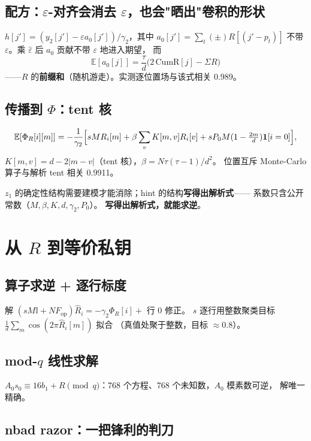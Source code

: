 \documentclass[11pt,a4paper]{ctexart}
\begin{document}
\subsection{配方：$\varepsilon$-对齐会消去 $\varepsilon$，也会"晒出"卷积的形状}

$h[j'] = (y_2[j'] - \varepsilon a_0[j'])/\gamma_2$，其中 $a_0[j'] = \sum_t(\pm)R[(j'-p_t)]$
不带 $\varepsilon$。乘 $\hat\varepsilon$ 后 $a_0$ 贡献不带 $\varepsilon$ 地进入期望，
而
\[
\mathbb{E}[a_0[j]] = \frac{\tau}{d}\bigl(2\,\mathrm{CumR}[j] - \Sigma R\bigr)
\]
——$R$ 的\textbf{前缀和}（随机游走）。实测逐位置场与该式相关 0.989。

\subsection{传播到 $\Phi$：tent 核}

\[
\mathbb{E}[\Phi_R[i][m]] = -\frac{1}{\gamma_2}\Bigl[
s M R_i[m] + \beta\sum_v K[m,v]R_i[v]
+ s P_0 M (1-\tfrac{2m}{d})\mathbf{1}[i=0]\Bigr],
\]
$K[m,v] = d - 2|m-v|$（tent 核），$\beta = N\tau(\tau-1)/d^2$。
位置互斥 Monte-Carlo 算子与解析 tent 相关 0.9911。

\begin{intuition}[本章的"啊哈"]
$z_1$ 的确定性结构需要建模才能消除；hint 的结构\textbf{写得出解析式}——
系数只含公开常数（$M,\beta,K,d,\gamma_2,P_0$）。
\textbf{写得出解析式，就能求逆}。
\end{intuition}

\section{从 $R$ 到等价私钥}

\subsection{算子求逆 + 逐行标度}

解 $(sM\mathbb{I} + N F_{\mathrm{op}})\hat R_i = -\gamma_2\Phi_R[i] + $ 行 0 修正。
$s$ 逐行用整数聚类目标 $\frac1d\sum_m\cos(2\pi\hat R_i[m])$ 拟合
（真值处聚于整数，目标 $\approx0.8$）。

\subsection{mod-$q$ 线性求解}

$A_0 s_0 \equiv 16b_1 + R \pmod q$：768 个方程、768 个未知数，$A_0$ 模素数可逆，
解唯一精确。

\subsection{nbad razor：一把锋利的判刀}
\end{document}

